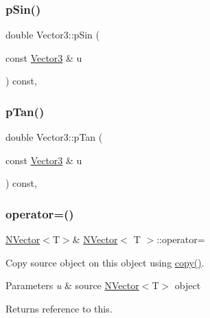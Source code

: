 \subsubsection{\texorpdfstring{pSin()}{pSin()}}
{\footnotesize\ttfamily double Vector3\+::p\+Sin (\begin{DoxyParamCaption}\item[{const \mbox{\hyperlink{class_vector3}{Vector3}} \&}]{u }\end{DoxyParamCaption}) const\hspace{0.3cm}{\ttfamily [inline]}, {\ttfamily [protected]}}

\mbox{\label{class_vector3_a1b31e026535ee175589d8f6a16c6ce15}} 
\subsubsection{\texorpdfstring{pTan()}{pTan()}}
{\footnotesize\ttfamily double Vector3\+::p\+Tan (\begin{DoxyParamCaption}\item[{const \mbox{\hyperlink{class_vector3}{Vector3}} \&}]{u }\end{DoxyParamCaption}) const\hspace{0.3cm}{\ttfamily [inline]}, {\ttfamily [protected]}}

\mbox{\label{class_vector3_ab793bf6d3d3fc05f91f435c1c0a8e5ea}} 
\subsubsection{\texorpdfstring{operator=()}{operator=()}}
{\footnotesize\ttfamily \mbox{\hyperlink{class_n_vector}{N\+Vector}}$<$T$>$\& \mbox{\hyperlink{class_n_vector}{N\+Vector}}$<$ T $>$\+::operator=\hspace{0.3cm}{\ttfamily [inline]}}



Copy source object on this object using {\ttfamily \mbox{\hyperlink{class_n_vector_a67128d2ff536b8ccd7a95cb680bd0431}{copy()}}}. 


\begin{DoxyParams}{Parameters}
{\em u} & source {\ttfamily \mbox{\hyperlink{class_n_vector}{N\+Vector}}$<$T$>$} object \\
\hline
\end{DoxyParams}
\begin{DoxyReturn}{Returns}
reference to {\ttfamily this}. 
\end{DoxyReturn}
\mbox{\label{class_vector3_a786957fb5d1d9bdec7e6ced65bce03c0}} 
